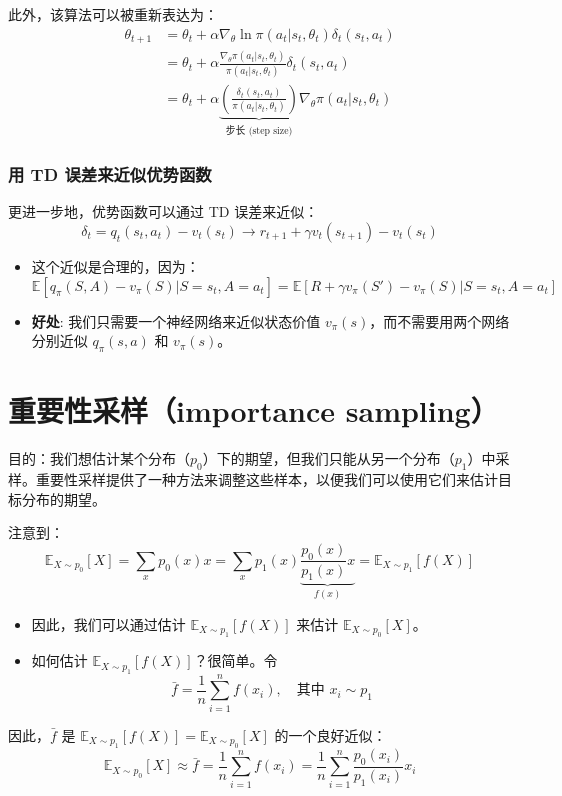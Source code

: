 \documentclass{article}
\begin{document}
此外，该算法可以被重新表达为：
\begin{align*}
    \theta_{t+1} &= \theta_t + \alpha \nabla_{\theta} \ln \pi(a_t|s_t, \theta_t)\delta_t(s_t, a_t) \\
    &= \theta_t + \alpha \frac{\nabla_{\theta} \pi(a_t|s_t, \theta_t)}{\pi(a_t|s_t, \theta_t)} \delta_t(s_t, a_t) \\
    &= \theta_t + \alpha \underbrace{\left( \frac{\delta_t(s_t, a_t)}{\pi(a_t|s_t, \theta_t)} \right)}_{\text{步长 (step size)}} \nabla_{\theta} \pi(a_t|s_t, \theta_t)
\end{align*}

\subsubsection*{用 TD 误差来近似优势函数}
更进一步地，优势函数可以通过 TD 误差来近似：
\[
\delta_t = q_t(s_t, a_t) - v_t(s_t) \to r_{t+1} + \gamma v_t(s_{t+1}) - v_t(s_t)
\]
\begin{itemize}
    \item 这个近似是合理的，因为：
    \[
    \mathbb{E}[q_{\pi}(S, A) - v_{\pi}(S)|S = s_t, A = a_t] = \mathbb{E}[R+\gamma v_{\pi}(S')-v_{\pi}(S)|S = s_t, A = a_t]
    \]
    \item \textbf{好处}: 我们只需要一个神经网络来近似状态价值 $v_{\pi}(s)$，而不需要用两个网络分别近似 $q_{\pi}(s, a)$ 和 $v_{\pi}(s)$。
\end{itemize}
\section{重要性采样（importance sampling）}
目的：我们想估计某个分布（$p_0$）下的期望，但我们只能从另一个分布（$p_1$）中采样。重要性采样提供了一种方法来调整这些样本，以便我们可以使用它们来估计目标分布的期望。

注意到：
\[
\mathbb{E}_{X \sim p_0}[X] = \sum_x p_0(x) x = \sum_x p_1(x) \underbrace{\frac{p_0(x)}{p_1(x)} x}_{f(x)} = \mathbb{E}_{X \sim p_1}[f(X)]
\]

\begin{itemize}
    \item 因此，我们可以通过估计 $\mathbb{E}_{X \sim p_1}[f(X)]$ 来估计 $\mathbb{E}_{X \sim p_0}[X]$。
    \item 如何估计 $\mathbb{E}_{X \sim p_1}[f(X)]$？很简单。令
    \[
    \bar{f} = \frac{1}{n} \sum_{i=1}^{n} f(x_i), \quad \text{其中 } x_i \sim p_1
    \]
\end{itemize}

因此，$\bar{f}$ 是 $\mathbb{E}_{X \sim p_1}[f(X)] = \mathbb{E}_{X \sim p_0}[X]$ 的一个良好近似：
\[
\mathbb{E}_{X \sim p_0}[X] \approx \bar{f} = \frac{1}{n} \sum_{i=1}^{n} f(x_i) = \frac{1}{n} \sum_{i=1}^{n} \frac{p_0(x_i)}{p_1(x_i)} x_i
\]
\end{document}
